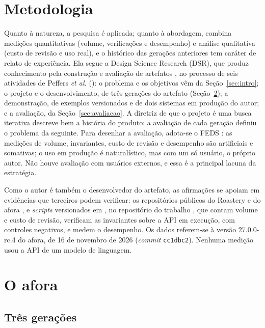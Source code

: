 \documentclass[a4paper,12pt]{article}
\providecommand{\NoCaseChange}[1]{#1} %
\DeclareRobustCommand{\etal}{\NoCaseChange{\textit{et al.}}}
\newcommand{\estr}[1]{\textit{#1}}
\begin{document}
\section{Metodologia}\label{sec:metodo}

Quanto à natureza, a pesquisa é aplicada; quanto à abordagem, combina medições quantitativas (volume, verificações e desempenho) e análise qualitativa (custo de revisão e uso real), e o histórico das gerações anteriores tem caráter de relato de experiência. Ela segue a Design Science Research (DSR), que produz conhecimento pela construção e avaliação de artefatos \citep{hevner2004}, no processo de seis atividades de Peffers \etal{} (\citeyear{peffers2007}): o problema e os objetivos vêm da Seção~\ref{sec:intro}; o projeto e o desenvolvimento, de três gerações do artefato (Seção~\ref{sec:afora}); a demonstração, de exemplos versionados e de dois sistemas em produção do autor; e a avaliação, da Seção~\ref{sec:avaliacao}. A diretriz de que o projeto é uma busca iterativa descreve bem a história do produto: a avaliação de cada geração definiu o problema da seguinte. Para desenhar a avaliação, adota-se o FEDS \citep{venable2016}: as medições de volume, invariantes, custo de revisão e desempenho são artificiais e somativas; o uso em produção é naturalístico, mas com um só usuário, o próprio autor. Não houve avaliação com usuários externos, e essa é a principal lacuna da estratégia.

Como o autor é também o desenvolvedor do artefato, as afirmações se apoiam em evidências que terceiros podem verificar: os repositórios públicos do Roastery \citep{anjos2026roastery} e do afora \citep{anjos2026afora}, e \estr{scripts} versionados em , no repositório do trabalho \citep{anjos2026tcc}, que contam volume e custo de revisão, verificam as invariantes sobre a API em execução, com controles negativos, e medem o desempenho. Os dados referem-se à versão 27.0.0-rc.4 do afora, de 16 de novembro de 2026 (\estr{commit} \texttt{cc1dbc2}). Nenhuma medição usou a API de um modelo de linguagem.

\section{O afora}\label{sec:afora}

\subsection{Três gerações}
\end{document}
